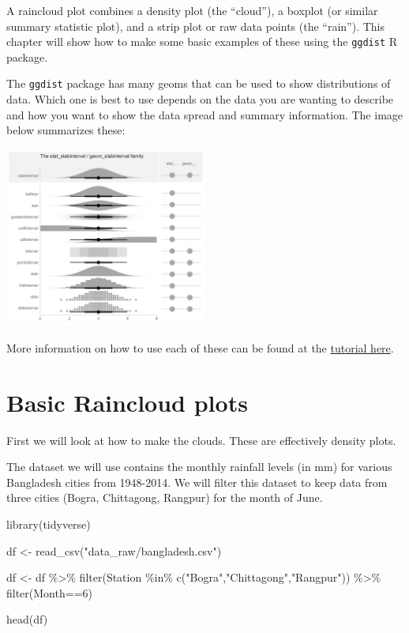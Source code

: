 \documentclass[
  letterpaper,
  DIV=11,
  numbers=noendperiod]{scrreprt}
\newenvironment{Shaded}{\begin{snugshade}}{\end{snugshade}}
\newcommand{\DecValTok}[1]{\textcolor[rgb]{0.68,0.00,0.00}{#1}}
\newcommand{\FunctionTok}[1]{\textcolor[rgb]{0.28,0.35,0.67}{#1}}
\newcommand{\NormalTok}[1]{\textcolor[rgb]{0.00,0.23,0.31}{#1}}
\newcommand{\OtherTok}[1]{\textcolor[rgb]{0.00,0.23,0.31}{#1}}
\newcommand{\SpecialCharTok}[1]{\textcolor[rgb]{0.37,0.37,0.37}{#1}}
\newcommand{\StringTok}[1]{\textcolor[rgb]{0.13,0.47,0.30}{#1}}
\begin{document}
A raincloud plot combines a density plot (the ``cloud''), a boxplot (or
similar summary statistic plot), and a strip plot or raw data points
(the ``rain''). This chapter will show how to make some basic examples
of these using the \texttt{ggdist} R package.

The \texttt{ggdist} package has many geoms that can be used to show
distributions of data. Which one is best to use depends on the data you
are wanting to describe and how you want to show the data spread and
summary information. The image below summarizes these:

\includegraphics[width=0.5\textwidth,height=\textheight]{./img/slabinterval_family-1.png}

More information on how to use each of these can be found at the
\href{https://mjskay.github.io/ggdist/articles/slabinterval.html}{tutorial
here}.

\hypertarget{basic-raincloud-plots}{%
\section{Basic Raincloud plots}\label{basic-raincloud-plots}}

First we will look at how to make the clouds. These are effectively
density plots.

The dataset we will use contains the monthly rainfall levels (in mm) for
various Bangladesh cities from 1948-2014. We will filter this dataset to
keep data from three cities (Bogra, Chittagong, Rangpur) for the month
of June.

\begin{Shaded}
\begin{Highlighting}[]
\FunctionTok{library}\NormalTok{(tidyverse)}

\NormalTok{df }\OtherTok{\textless{}{-}} \FunctionTok{read\_csv}\NormalTok{(}\StringTok{"data\_raw/bangladesh.csv"}\NormalTok{)}

\NormalTok{df }\OtherTok{\textless{}{-}}\NormalTok{ df }\SpecialCharTok{\%\textgreater{}\%} 
  \FunctionTok{filter}\NormalTok{(Station }\SpecialCharTok{\%in\%} \FunctionTok{c}\NormalTok{(}\StringTok{"Bogra"}\NormalTok{,}\StringTok{"Chittagong"}\NormalTok{,}\StringTok{"Rangpur"}\NormalTok{)) }\SpecialCharTok{\%\textgreater{}\%} 
  \FunctionTok{filter}\NormalTok{(Month}\SpecialCharTok{==}\DecValTok{6}\NormalTok{)}

\FunctionTok{head}\NormalTok{(df)}
\end{Highlighting}
\end{Shaded}
\end{document}
